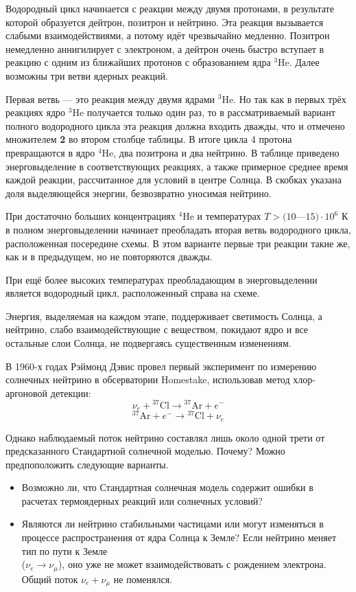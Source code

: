 \documentclass[a4paper,12pt]{article}
\begin{document}
Водородный цикл начинается с реакции между двумя протонами, в результате которой образуется дейтрон, позитрон и нейтрино. Эта реакция вызывается слабыми взаимодействиями, а потому идёт чрезвычайно медленно. Позитрон немедленно аннигилирует с электроном, а дейтрон очень быстро вступает в реакцию с одним из ближайших протонов с образованием ядра $\mathrm{{}^{3}He}$. Далее возможны три ветви ядерных реакций.

Первая ветвь --- это реакция между двумя ядрами $\mathrm{{}^{3}He}$. Но так как в первых трёх реакциях ядро $\mathrm{{}^{3}He}$ получается только один раз, то в рассматриваемый вариант полного водородного цикла эта реакция должна входить дважды, что и отмечено множителем \textbf{2} во втором столбце таблицы. В итоге цикла 4 протона превращаются в ядро $\mathrm{{}^{4}He}$, два позитрона и два нейтрино. В таблице приведено энерговыделение в соответствующих реакциях, а также примерное среднее время каждой реакции, рассчитанное для условий в центре Солнца. В скобках указана доля выделяющейся энергии, безвозвратно уносимая нейтрино.

При достаточно больших концентрациях $\mathrm{{}^{4}He}$ и температурах $T > (10$---$15)\cdot 10^6$ К в полном энерговыделении начинает преобладать вторая ветвь водородного цикла, расположенная посередине схемы. В этом варианте первые три реакции такие же, как и в предыдущем, но не повторяются дважды.

При ещё более высоких температурах преобладающим в энерговыделении является водородный цикл, расположенный справа на схеме.

Энергия, выделяемая на каждом этапе, поддерживает светимость Солнца, а нейтрино, слабо взаимодействующие с веществом, покидают ядро и все остальные слои Солнца, не подвергаясь существенным изменениям.

В 1960-х годах Рэймонд Дэвис провел первый эксперимент по измерению солнечных нейтрино в обсерватории Homestake, использовав метод хлор-аргоновой детекции:
\[
\nu_e + \mathrm{{}^{37}Cl} \rightarrow \mathrm{{}^{37}Ar} + e^{-}
\]
\[
\mathrm{{}^{37}Ar} + e^{-} \rightarrow \mathrm{{}^{37}Cl} +  \nu_e
\]

Однако наблюдаемый поток нейтрино составлял лишь около одной трети от предсказанного Стандартной солнечной моделью. Почему? Можно предпоположить следующие варианты.

\begin{itemize}
    \item Возможно ли, что Стандартная солнечная модель содержит ошибки в расчетах термоядерных реакций или солнечных условий? 
    \item Являются ли нейтрино стабильными частицами или могут изменяться в процессе распространения от ядра Солнца к Земле? Если нейтрино меняет тип по пути к Земле\\ ($\nu_e\to\nu_\mu$), оно уже не может взаимодействовать с рождением электрона. Общий поток $\nu_e+\nu_\mu$ не поменялся.
\end{itemize}
\end{document}
